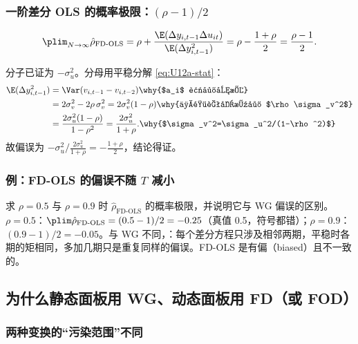 \subsubsection{一阶差分 OLS 的概率极限：\texorpdfstring{$(\rho-1)/2$}{(rho-1)/2}}

\begin{thm}\label{thm:U12a-fdols}
\[
\plim_{N\to\infty}\hat\rho_{\text{FD-OLS}}=\rho+\frac{\E(\Delta y_{i,t-1}\Delta u_{it})}{\E(\Delta y_{i,t-1}^2)}=\rho-\frac{1+\rho}{2}=\frac{\rho-1}{2}.
\]
\end{thm}

分子已证为 $-\sigma_u^2$。分母用平稳分解 \eqref{eq:U12a-stat}：
\begin{align*}
\E(\Delta y_{i,t-1}^2)&=\Var(v_{i,t-1}-v_{i,t-2}) \why{$a_i$ 被差分掉}\\
&=2\sigma_v^2-2\rho\,\sigma_v^2=2\sigma_v^2(1-\rho) \why{一阶自协方差 $\rho\sigma_v^2$}\\
&=\frac{2\sigma_u^2(1-\rho)}{1-\rho^2}=\frac{2\sigma_u^2}{1+\rho}. \why{$\sigma_v^2=\sigma_u^2/(1-\rho^2)$}
\end{align*}
故偏误为 $-\sigma_u^2\big/\frac{2\sigma_u^2}{1+\rho}=-\frac{1+\rho}2$，结论得证。

\subsubsection{例：FD-OLS 的偏误不随 \texorpdfstring{$T$}{T} 减小}

\begin{exmp}\label{ex:U12a-fdols}
求 $\rho=0.5$ 与 $\rho=0.9$ 时 $\hat\rho_{\text{FD-OLS}}$ 的概率极限，并说明它与 WG 偏误的区别。
\solution $\rho=0.5$：$\plim\hat\rho_{\text{FD-OLS}}=(0.5-1)/2=-0.25$（真值 0.5，符号都错）；$\rho=0.9$：$(0.9-1)/2=-0.05$。与 WG 不同，：每个差分方程只涉及相邻两期，平稳时各期的矩相同，多加几期只是重复同样的偏误。FD-OLS 是有偏（biased）且不一致的。
\end{exmp}

\subsection{为什么静态面板用 WG、动态面板用 FD（或 FOD）}

\subsubsection{两种变换的“污染范围”不同}

